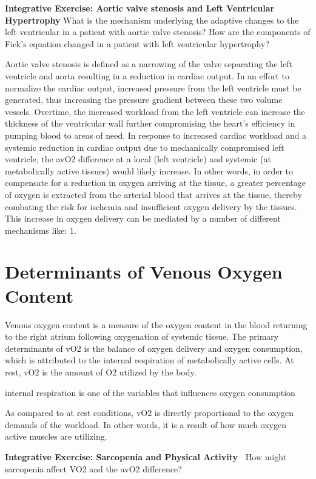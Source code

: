 {\begin{itemize}
\textbf{Integrative Exercise: Aortic valve stenosis and Left Ventricular Hypertrophy }
What is the mechanism underlying the adaptive changes to the left ventricular in a patient with aortic valve stenosis? How are the components of Fick’s equation changed in a patient with left ventricular hypertrophy? 

Aortic valve stenosis is defined as a narrowing of the valve separating the left ventricle and aorta resulting in a reduction in cardiac output. In an effort to normalize the cardiac output, increased pressure from the left ventricle must be generated, thus increasing the pressure gradient between these two volume vessels. Overtime, the increased workload from the left ventricle can increase the thickness of the ventricular wall further compromising the heart's efficiency in pumping blood to areas of need. 
In response to increased cardiac workload and a systemic reduction in cardiac output due to mechanically compromised left ventricle, the avO2 difference at a local (left ventricle) and systemic (at metabolically active tissues) would likely increase. In other words, in order to compensate for a reduction in oxygen arriving at the tissue, a greater percentage of oxygen is extracted from the arterial blood that arrives at the tissue, thereby combating the risk for ischemia and insufficient oxygen delivery by the tissues. 
This increase in oxygen delivery can be mediated by a number of different mechanisms like: 
1. 



\section{Determinants of Venous Oxygen Content}
Venous oxygen content is a measure of the oxygen content in the blood returning to the right atrium following oxygenation of systemic tissue. The primary determinants of vO2 is the balance of oxygen delivery and oxygen consumption, which is attributed to the internal respiration of metabolically active cells. At rest, vO2 is the amount of O2 utilized by the body. 



internal respiration is one of the variables that influences oxygen consumption 

As compared to at rest conditions, vO2 is directly proportional to the oxygen demands of the workload. In other words, it is a result of how much oxygen active muscles are utilizing. 

\textbf{Integrative Exercise: Sarcopenia and Physical Activity }
How might sarcopenia affect VO2 and the avO2 difference?  


\end{itemize}}

